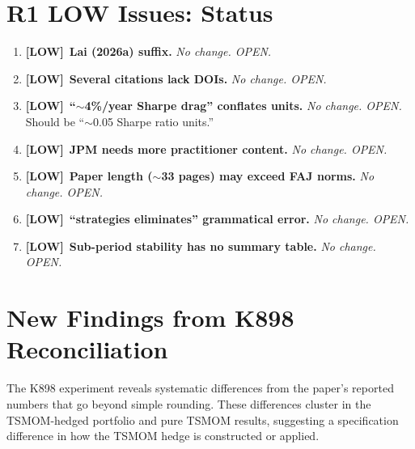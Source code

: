 \documentclass[12pt,a4paper]{article}
\newcommand{\LOW}{\textcolor{lowsev}{\textbf{[LOW]}}}
\begin{document}
\section{R1 LOW Issues: Status}
\label{sec:low}

\begin{enumerate}[label=\textbf{L\arabic*}., start=1]

\item \LOW\ \textbf{Lai (2026a) suffix.} \textit{No change. OPEN.}

\item \LOW\ \textbf{Several citations lack DOIs.} \textit{No change. OPEN.}

\item \LOW\ \textbf{``$\sim$4\%/year Sharpe drag'' conflates units.} \textit{No change. OPEN.} Should be ``$\sim$0.05 Sharpe ratio units.''

\item \LOW\ \textbf{JPM needs more practitioner content.} \textit{No change. OPEN.}

\item \LOW\ \textbf{Paper length ($\sim$33 pages) may exceed FAJ norms.} \textit{No change. OPEN.}

\item \LOW\ \textbf{``strategies eliminates'' grammatical error.} \textit{No change. OPEN.}

\item \LOW\ \textbf{Sub-period stability has no summary table.} \textit{No change. OPEN.}

\end{enumerate}


\section{New Findings from K898 Reconciliation}
\label{sec:k898}

The K898 experiment reveals systematic differences from the paper's reported numbers that go beyond simple rounding. These differences cluster in the TSMOM-hedged portfolio and pure TSMOM results, suggesting a specification difference in how the TSMOM hedge is constructed or applied.
\end{document}

